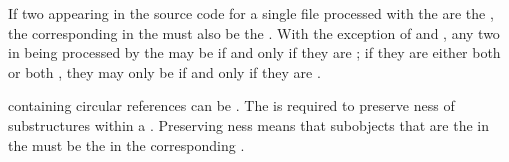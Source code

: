 \endsubsubsection%
  


If two  appearing in the source code for a single file
processed with
the  
are the ,
the corresponding  in the  
must also be the .
With the exception of  and , any two
in  being processed by
the 
may be  
if and only if they are ; 
if they are either both  or both ,
they may only be  if and only if they are .

 containing circular references can 
be .
The  is required to preserve ness of 
substructures within a .
Preserving ness means that subobjects that are
the 
in the  must 
be
the 
in the corresponding .

